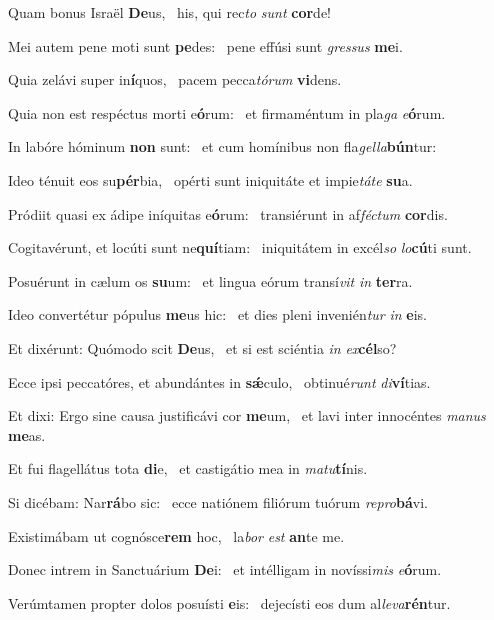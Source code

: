 \item Quam bonus Israël \textbf{De}us,~\psstar{} his, qui rec\textit{to} \textit{sunt} \textbf{cor}de!
\item Mei autem pene moti sunt \textbf{pe}des:~\psstar{} pene effúsi sunt \textit{gressus} \textbf{me}i.
\item Quia zelávi super in\textbf{í}quos,~\psstar{} pacem pecca\textit{tórum} \textbf{vi}dens.
\item Quia non est respéctus morti e\textbf{ó}rum:~\psstar{} et firmaméntum in pla\textit{ga} \textit{e}\textbf{ó}rum.
\item In labóre hóminum \textbf{non} sunt:~\psstar{} et cum homínibus non fla\textit{gella}\textbf{bún}tur:
\item Ideo ténuit eos su\textbf{pér}bia,~\psstar{} opérti sunt iniquitáte et impie\textit{táte} \textbf{su}a.
\item Pródiit quasi ex ádipe iníquitas e\textbf{ó}rum:~\psstar{} transiérunt in af\textit{féctum} \textbf{cor}dis.
\item Cogitavérunt, et locúti sunt ne\textbf{quí}tiam:~\psstar{} iniquitátem in excél\textit{so} \textit{lo}\textbf{cú}ti sunt.
\item Posuérunt in cælum os \textbf{su}um:~\psstar{} et lingua eórum transí\textit{vit} \textit{in} \textbf{ter}ra.
\item Ideo convertétur pópulus \textbf{me}us hic:~\psstar{} et dies pleni invenién\textit{tur} \textit{in} \textbf{e}is.
\item Et dixérunt: Quómodo scit \textbf{De}us,~\psstar{} et si est sciéntia \textit{in} \textit{ex}\textbf{cél}so?
\item Ecce ipsi peccatóres, et abundántes in \textbf{sǽ}culo,~\psstar{} obtinué\textit{runt} \textit{di}\textbf{ví}tias.
\item Et dixi: Ergo sine causa justificávi cor \textbf{me}um,~\psstar{} et lavi inter innocéntes \textit{manus} \textbf{me}as.
\item Et fui flagellátus tota \textbf{di}e,~\psstar{} et castigátio mea in \textit{matu}\textbf{tí}nis.
\item Si dicébam: Nar\textbf{rá}bo sic:~\psstar{} ecce natiónem filiórum tuórum \textit{repro}\textbf{bá}vi.
\item Existimábam ut cognósce\textbf{rem} hoc,~\psstar{} la\textit{bor} \textit{est} \textbf{an}te me.
\item Donec intrem in Sanctuárium \textbf{De}i:~\psstar{} et intélligam in novíssi\textit{mis} \textit{e}\textbf{ó}rum.
\item Verúmtamen propter dolos posuísti \textbf{e}is:~\psstar{} dejecísti eos dum al\textit{leva}\textbf{rén}tur.
